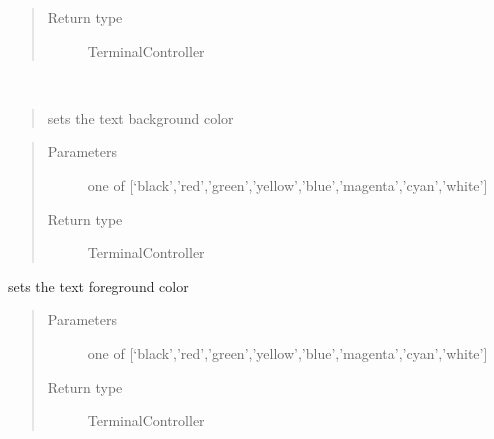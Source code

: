 \documentclass[a4paper,10pt,english]{sphinxmanual}
\begin{document}
\begin{fulllineitems}
\begin{fulllineitems}
\begin{quote}
\begin{description}
\begin{itemize}
\end{itemize}

\item[{Return type}] \leavevmode
TerminalController

\end{description}\end{quote}

\end{fulllineitems}


\begin{fulllineitems}
\label{\detokenize{api/termtools.terminal.TerminalController:termtools.terminal.TerminalController.set_background}}~\begin{quote}

sets the text background color
\end{quote}
\begin{quote}\begin{description}
\item[{Parameters}] \leavevmode
{} \textendash{} one of {[}‘black’,’red’,’green’,’yellow’,’blue’,’magenta’,’cyan’,’white’{]}

\item[{Return type}] \leavevmode
TerminalController

\end{description}\end{quote}

\end{fulllineitems}


\begin{fulllineitems}
\label{\detokenize{api/termtools.terminal.TerminalController:termtools.terminal.TerminalController.set_foreground}}
sets the text foreground color
\begin{quote}\begin{description}
\item[{Parameters}] \leavevmode
{} \textendash{} one of {[}‘black’,’red’,’green’,’yellow’,’blue’,’magenta’,’cyan’,’white’{]}

\item[{Return type}] \leavevmode
TerminalController


\end{description}
\end{quote}
\end{fulllineitems}
\end{fulllineitems}
\end{document}
